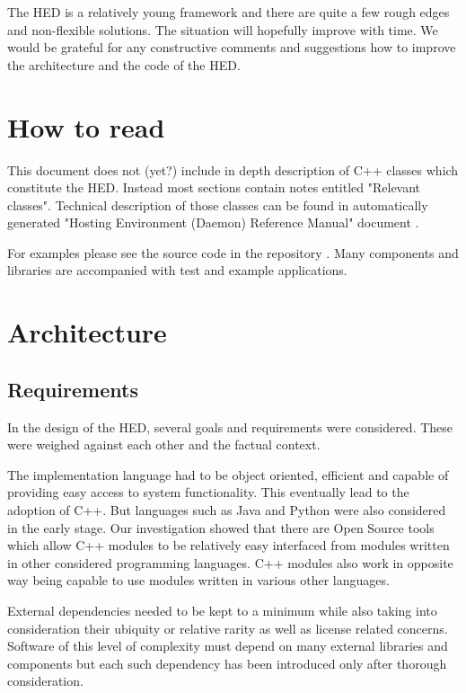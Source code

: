 \documentclass{book}
\begin{document}
The HED is a relatively young framework and there are quite a few rough edges and non-flexible solutions. The situation will hopefully improve with time. We would be grateful for any constructive comments and suggestions how to improve the architecture and the code of the HED. 

\chapter{How to read}

This document does not (yet?) include in depth description of C++ classes which constitute the HED. Instead most sections contain notes entitled "Relevant classes". Technical description of those classes can be found in automatically generated "Hosting Environment (Daemon) Reference Manual" document \cite{hed-api}.

For examples please see the source code in the repository \cite{svn-arc1}. Many components and libraries are accompanied with test and example applications.


\chapter{Architecture}

\section{Requirements}
In the design of the HED, several goals and requirements were considered. These were weighed against each other and the factual context.

The implementation language had to be object oriented, efficient and capable of providing easy access to system functionality. This eventually lead to the adoption of C++. But languages such as Java and Python were also considered in the early stage.
Our investigation showed that there are Open Source tools which allow C++ modules to be relatively easy interfaced from modules written in other considered programming languages. C++ modules also work in opposite way being capable to use modules written in various other languages.

External dependencies needed to be kept to a minimum while also taking into consideration their ubiquity or relative rarity as well as license related concerns. Software of this level of complexity must depend on many external libraries and components but each such dependency has been introduced only after thorough consideration.
\end{document}
